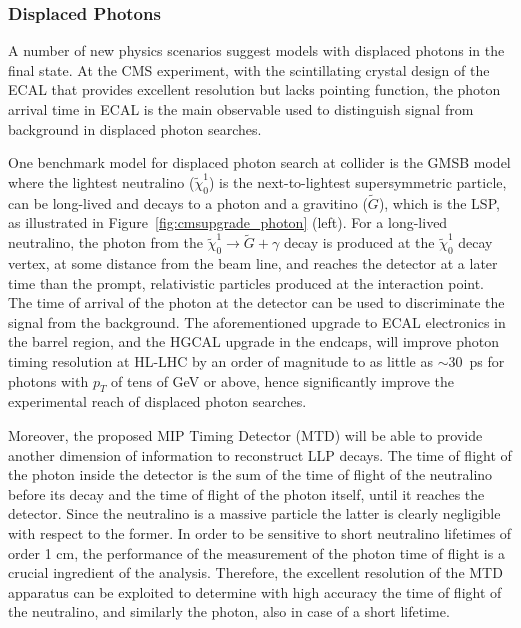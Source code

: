 \subsubsection{Displaced Photons}

A number of new physics scenarios suggest models with displaced photons in the final state. 
At the CMS experiment, with the scintillating crystal design of the ECAL that provides excellent resolution but lacks pointing function, the photon arrival time in ECAL is the main observable used to distinguish signal from
background in displaced photon searches. 

One benchmark model for displaced photon search at collider is the GMSB model 
where the lightest neutralino ($\tilde{\chi}_0^1$) is the next-to-lightest supersymmetric particle, can be long-lived and decays to a photon and a gravitino ($\tilde{G}$), which is the LSP, as illustrated in Figure~\ref{fig:cmsupgrade_photon} (left).
For a long-lived neutralino, the photon from the $\tilde{\chi}_0^1 \to \tilde{G} + \gamma$ decay is produced at the $\tilde{\chi}_0^1$
decay vertex, at some distance from the beam line, and reaches the detector at a later time than
the prompt, relativistic particles produced at the interaction point. 
The time of arrival of the photon at the detector can be used to discriminate the signal from the background.
The aforementioned upgrade to ECAL electronics in the barrel region, and the HGCAL upgrade in the endcaps, will improve photon timing resolution at HL-LHC by an order of magnitude to as little as $\sim30$~ps for photons with $p_T$ of tens of GeV or above, hence significantly improve the experimental reach of displaced photon searches. 

Moreover, the proposed MIP Timing Detector (MTD) will be able to provide another dimension of information to reconstruct LLP decays. 
The time of flight of the photon inside the detector is the sum of the time of flight of the neutralino before its decay and the time of flight of the photon itself, until it reaches the detector.
Since the neutralino is a massive particle the latter is clearly negligible with respect to the former. 
In order to be sensitive to short neutralino lifetimes of order 1 cm, the performance of the measurement of the photon time of flight is a crucial ingredient of the analysis. 
Therefore, the excellent resolution of the MTD apparatus can be exploited to determine with high accuracy the time of flight of the neutralino, and similarly the photon, also in case of a short lifetime.

